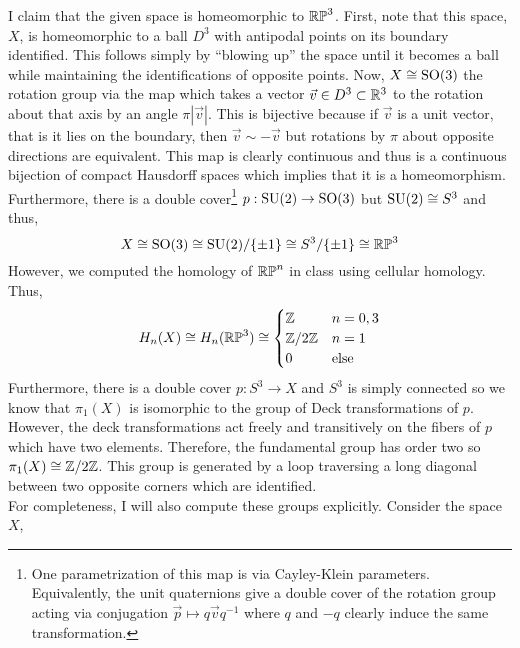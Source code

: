 \documentclass[12pt]{extarticle}
\begin{document}
I claim that the given space is homeomorphic to $\mathbb{RP}^3$. First, note that this space, $X$, is  homeomorphic to a ball $D^3$ with antipodal points on its boundary identified. This follows simply by ``blowing up'' the space until it becomes a ball while maintaining the identifications of opposite points. Now, $X \cong \mathrm{SO}(3)$ the rotation group via the map which takes a vector $\vec{v} \in D^3 \subset \mathbb{R}^3$ to the rotation about that axis by an angle $\pi |\vec{v}|$. This is bijective because if $\vec{v}$ is a unit vector, that is it lies on the boundary, then $\vec{v} \sim -\vec{v}$ but rotations by $\pi$ about opposite directions are equivalent. This map is clearly continuous and thus is a continuous bijection of compact Hausdorff spaces which implies that it is a homeomorphism. Furthermore, there is a double cover\footnote{One parametrization of this map is via Cayley-Klein parameters. Equivalently, the unit quaternions give a double cover of the rotation group acting via conjugation $\vec{p} \mapsto q \vec{v} q^{-1}$ where $q$ and $-q$ clearly induce the same transformation.} $p : \mathrm{SU}(2) \to \mathrm{SO}(3)$ but $\mathrm{SU}(2) \cong S^3$ and thus, 
\[ X \cong \mathrm{SO}(3) \cong \mathrm{SU}(2) / \{\pm 1\} \cong S^3 / \{ \pm 1 \} \cong \mathbb{RP}^3\]
However, we computed the homology of $\mathbb{RP}^n$ in class using cellular homology. Thus,
\[ H_n(X) \cong H_n(\mathbb{RP}^3) \cong 
\begin{cases}
\mathbb{Z} & n = 0,3 
\\
\mathbb{Z} / 2 \mathbb{Z} & n = 1 
\\
0 & \text{else}
\end{cases}\] 
Furthermore, there is a double cover $p : S^3 \to X$ and $S^3$ is simply connected so we know that $\pi_1(X)$ is isomorphic to the group of Deck transformations of $p$. However, the deck transformations act freely and transitively on the fibers of $p$ which have two elements. Therefore, the fundamental group has order two so $\pi_1(X) \cong \mathbb{Z} / 2 \mathbb{Z}$. This group is generated by a loop traversing a long diagonal between two opposite corners which are identified. 
\bigskip\\
For completeness, I will also compute these groups explicitly. Consider the space $X$,
\end{document}
